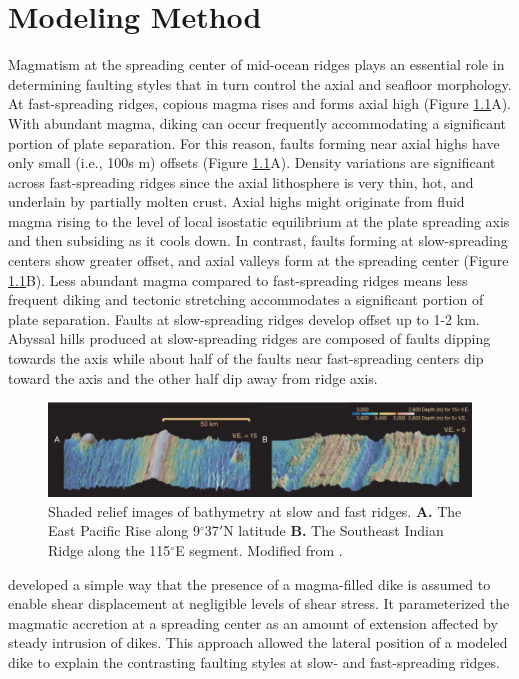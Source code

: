 \documentclass[letterpaper,12pt,notitle]{memphisthesis}                     %
\begin{document}
\chapter{Modeling Method}

Magmatism at the spreading center of mid-ocean ridges plays an essential role in determining faulting styles that in turn control the axial and seafloor morphology. At fast-spreading ridges, copious magma rises and forms axial high (Figure \ref{fig:ridgebathymetry}A). With abundant magma, diking can occur frequently accommodating a significant portion of plate separation. For this reason, faults forming near axial highs have only small (i.e., 100s m) offsets (Figure \ref{fig:ridgebathymetry}A). Density variations are significant across fast-spreading ridges since the axial lithosphere is very thin, hot, and underlain by partially molten crust. Axial highs might originate from fluid magma rising to the level of local isostatic equilibrium at the plate spreading axis and then subsiding as it cools down. In contrast, faults forming at slow-spreading centers show greater offset, and axial valleys form at the spreading center (Figure \ref{fig:ridgebathymetry}B). Less abundant magma compared to fast-spreading ridges means less frequent diking and tectonic stretching accommodates a significant portion of plate separation. Faults at slow-spreading ridges develop offset up to 1-2 km. Abyssal hills produced at slow-spreading ridges are composed of faults dipping towards the axis while about half of the faults near fast-spreading centers dip toward the axis and the other half dip away from ridge axis.

\begin{figure}[!htb]
	\centering
	\includegraphics[width=0.99\linewidth]{./figs/bathy_buck.png}
	\caption{Shaded relief images of bathymetry at slow and fast ridges. \textbf{A.} The East Pacific Rise along 9$^\circ$37$'$N latitude \textbf{B.} The Southeast Indian Ridge along the 115$^\circ$E segment. Modified from \citet{Buck2005}.}
	\label{fig:ridgebathymetry}
\end{figure}

\citet{Buck1998} developed a simple way %
that the presence of a magma-filled dike is assumed to enable shear displacement at negligible levels of shear stress. It parameterized the magmatic accretion at a spreading center as an amount of extension affected by steady intrusion of dikes. This approach allowed the lateral position of a modeled dike to explain the contrasting faulting styles at slow- and fast-spreading ridges.
\end{document}
